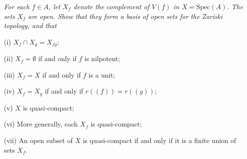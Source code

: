 \begin{problem}\em
For each $f\in A$, let $X_f$ denote the complement of $V(f)$ in $X=\mathrm{Spec}(A)$. The sets $X_f$ are open. Show that they form a basis of open sets for the Zariski topology, and that \par
(i) $X_f\cap X_g=X_{fg}$;\par
(ii) $X_f=\emptyset$ if and only if $f$ is nilpotent;\par
(iii) $X_f=X$ if and only if $f$ is a unit;\par
(iv) $X_f=X_g$ if and only if $r((f))=r((g))$;\par
(v) $X$ is quasi-compact;\par
(vi) More generally, each $X_f$ is quasi-compact;\par
(vii) An open subset of $X$ is quasi-compact if and only if it is a finite union of sets $X_f$.
\end{problem}
